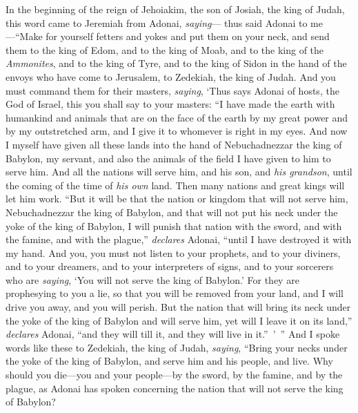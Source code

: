 \begin{biblechapter} %
 In the beginning of the reign of Jehoiakim, the son of Josiah, the king of Judah, this word came to Jeremiah from Adonai, \textit{saying}—
\verse thus said Adonai to me—“Make for yourself fetters and yokes and put them on your neck,
\verse and send them to the king of Edom, and to the king of Moab, and to the king of the \textit{Ammonites}, and to the king of Tyre, and to the king of Sidon in the hand of the envoys who have come to Jerusalem, to Zedekiah, the king of Judah.
\verse And you must command them for their masters, \textit{saying}, ‘Thus says Adonai of hosts, the God of Israel, this you shall say to your masters:
\verse “I have made the earth with humankind and animals that are on the face of the earth by my great power and by my outstretched arm, and I give it to whomever is right in my eyes.
\verse And now I myself have given all these lands into the hand of Nebuchadnezzar the king of Babylon, my servant, and also the animals of the field I have given to him to serve him.
\verse And all the nations will serve him, and his son, and \textit{his grandson}, until the coming of the time of \textit{his own} land. Then many nations and great kings will let him work.
\verse “But it will be that the nation or kingdom that will not serve him, Nebuchadnezzar the king of Babylon, and that will not put his neck under the yoke of the king of Babylon, I will punish that nation with the sword, and with the famine, and with the plague,” \textit{declares} Adonai, “until I have destroyed it with my hand.
\verse And you, you must not listen to your prophets, and to your diviners, and to your dreamers, and to your interpreters of signs, and to your sorcerers who are \textit{saying}, ‘You will not serve the king of Babylon.’
\verse For they are prophesying to you a lie, so that you will be removed from your land, and I will drive you away, and you will perish.
\verse But the nation that will bring its neck under the yoke of the king of Babylon and will serve him, yet will I leave it on its land,” \textit{declares} Adonai, “and they will till it, and they will live in it.” ’ ”
\verse And I spoke words like these to Zedekiah, the king of Judah, \textit{saying}, “Bring your necks under the yoke of the king of Babylon, and serve him and his people, and live.
\verse Why should you die—you and your people—by the sword, by the famine, and by the plague, as Adonai has spoken concerning the nation that will not serve the king of Babylon?

\end{biblechapter}
